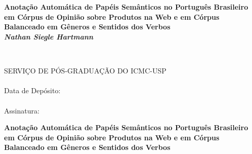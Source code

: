 \begin{titlepage}
\pagestyle{empty}

\newcommand{\titulo}{\textbf{Anotação Automática de Papéis Semânticos no Português Brasileiro em Córpus de Opinião sobre Produtos na Web e em Córpus Balanceado em Gêneros e Sentidos dos Verbos}}
\newcommand{\autor}{Nathan Siegle Hartmann}
\newcommand{\orientador}{Profa. Dra. Sandra Maria Aluísio}

\ \vfill

\begin{center}
\begin{minipage}[c]{12cm}
\begin{center}
\hrulefill\\
\vspace{.5cm} {\Large{}\selectfont \titulo}\\
\vspace{1.3cm}
\textbf{\textit {\autor}}\\
\vspace{0.3cm}
\vspace{.5cm}

\hrulefill\\
\end{center}
\end{minipage}
\end{center}

\vfill

\cleardoublepage


\begin{flushright}
\begin{Sbox}
\begin{minipage}{8.5cm}
\footnotesize
SERVIÇO DE  PÓS-GRADUAÇÃO DO ICMC-USP\\
\\
Data de Depósito: \\
\\
Assinatura:\hrulefill
\end{minipage}
\end{Sbox}
\fbox{\TheSbox}
\end{flushright}

\vspace*{3cm}
\begin{center}
{\Large{}\selectfont \titulo}


\vspace*{2cm}


\end{center}
\end{titlepage}
